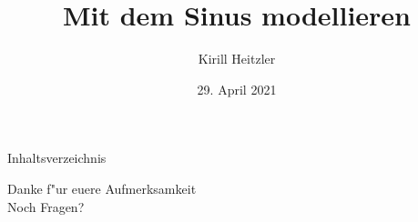 \documentclass[11pt]{beamer}
\title{Mit dem Sinus modellieren}
\author{Kirill Heitzler}
\date{29. April 2021} %
\begin{document}
\begin{frame}
    \titlepage
\end{frame}

\begin{frame}{Inhaltsverzeichnis}
    \tableofcontents[currentsection, hideothersubsections, sectionstyle=show/show]
\end{frame}

 





\begin{frame}
  \begin{center}
    Danke f{"u}r euere Aufmerksamkeit \\
    Noch Fragen?
  \end{center}
\end{frame}


\end{document}
